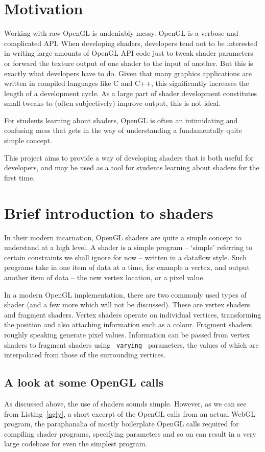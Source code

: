 \documentclass[12pt,twoside,notitlepage]{report}
\begin{document}
\section{Motivation}
Working with raw OpenGL is undeniably messy. OpenGL is a verbose and complicated API. When developing shaders, developers tend not to be interested in writing large amounts of OpenGL API code just to tweak shader parameters or forward the texture output of one shader to the input of another. But this is exactly what developers have to do. Given that many graphics applications are written in compiled languages like C and C++, this significantly increases the length of a development cycle. As a large part of shader development constitutes small tweaks to (often subjectively) improve output, this is not ideal.

For students learning about shaders, OpenGL is often an intimidating and confusing mess that gets in the way of understanding a fundamentally quite simple concept.

This project aims to provide a way of developing shaders that is both useful for developers, and may be used as a tool for students learning about shaders for the first time.
\section{Brief introduction to shaders}
\label{brief}
In their modern incarnation, OpenGL shaders are quite a simple concept to understand at a high level. A shader is a simple program -- `simple' referring to certain constraints we shall ignore for now -- written in a dataflow style. Such programs take in one item of data at a time, for example a vertex, and output another item of data -- the new vertex location, or a pixel value.

In a modern OpenGL implementation, there are two commonly used types of shader (and a few more which will not be discussed). These are vertex shaders and fragment shaders. Vertex shaders operate on individual vertices, transforming the position and also attaching information such as a colour. Fragment shaders roughly speaking generate pixel values. Information can be passed from vertex shaders to fragment shaders using \texttt{ varying } parameters, the values of which are interpolated from those of the surrounding vertices.

\subsection{A look at some OpenGL calls}
As discussed above, the use of shaders sounds simple. However, as we can see from Listing~\ref{ugly}, a short excerpt of the OpenGL calls from an actual WebGL program\cite{reaction-diffusion}, the paraphanalia of mostly boilerplate OpenGL calls required for compiling shader programs, specifying parameters and so on can result in a very large codebase for even the simplest program.
\end{document}
